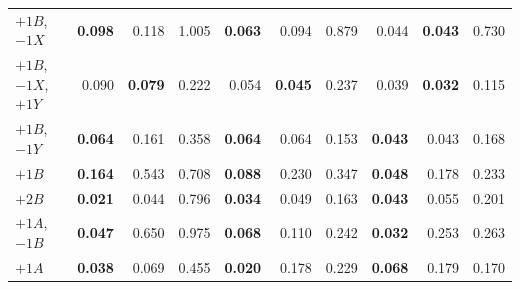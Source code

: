 \begin{table}[htbp]
\begin{tabular}{l rrr rrr rrr}
$+1B$, $-1X$ & \textbf{0.098} & 0.118 & 1.005 & \textbf{0.063} & 0.094 & 0.879 & 0.044 & \textbf{0.043} & 0.730 \\
$+1B$, $-1X$, $+1Y$ & 0.090 & \textbf{0.079} & 0.222 & 0.054 & \textbf{0.045} & 0.237 & 0.039 & \textbf{0.032} & 0.115 \\
$+1B$, $-1Y$ & \textbf{0.064} & 0.161 & 0.358 & \textbf{0.064} & 0.064 & 0.153 & \textbf{0.043} & 0.043 & 0.168 \\
$+1B$ & \textbf{0.164} & 0.543 & 0.708 & \textbf{0.088} & 0.230 & 0.347 & \textbf{0.048} & 0.178 & 0.233 \\
$+2B$ & \textbf{0.021} & 0.044 & 0.796 & \textbf{0.034} & 0.049 & 0.163 & \textbf{0.043} & 0.055 & 0.201 \\
$+1A$, $-1B$ & \textbf{0.047} & 0.650 & 0.975 & \textbf{0.068} & 0.110 & 0.242 & \textbf{0.032} & 0.253 & 0.263 \\
$+1A$ & \textbf{0.038} & 0.069 & 0.455 & \textbf{0.020} & 0.178 & 0.229 & \textbf{0.068} & 0.179 & 0.170 \\
\bottomrule
\end{tabular}
\end{table}